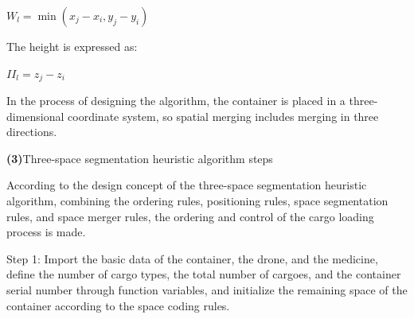 \documentclass{article} %
\begin{document}
\centerline{$W_{l}=\min \left(x_{j}-x_{i}, y_{j}-y_{i}\right)$}

The height is expressed as:

\centerline{$I I_{l}=z_{j}-z_{i}$}

In the process of designing the algorithm, the container is placed in a three-dimensional coordinate system, so spatial merging includes merging in three directions.

\textbf{(3)}{Three-space segmentation heuristic algorithm steps}

According to the design concept of the three-space segmentation heuristic algorithm, combining the ordering rules, positioning rules, space segmentation rules, and space merger rules, the ordering and control of the cargo loading process is made.

Step 1: Import the basic data of the container, the drone, and the medicine, define the number of cargo types, the total number of cargoes, and the container serial number through function variables, and initialize the remaining space of the container according to the space coding rules.
\end{document}

